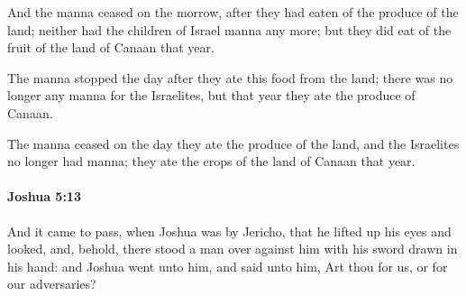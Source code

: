 			\begin{versebox}
					\item[BHS] 
					\item[ASV] And the manna ceased on the morrow, after they had eaten of the produce of the land; neither had the children of Israel manna any more; but they did eat of the fruit of the land of Canaan that year.
					\item[NIV] The manna stopped the day after they ate this food from the land; there was no longer any manna for the Israelites, but that year they ate the produce of Canaan.
					\item[NRSV] The manna ceased on the day they ate the produce of the land, and the Israelites no longer had manna; they ate the crops of the land of Canaan that year.
			\end{versebox}

		\paragraph{Joshua 5:13} %
			\label{JOSHUA-5-13}

			And it came to pass, when Joshua was by Jericho, that he lifted up his eyes and looked, and, behold, there stood a man over against him with his sword drawn in his hand: and Joshua went unto him, and said unto him, Art thou for us, or for our adversaries?

